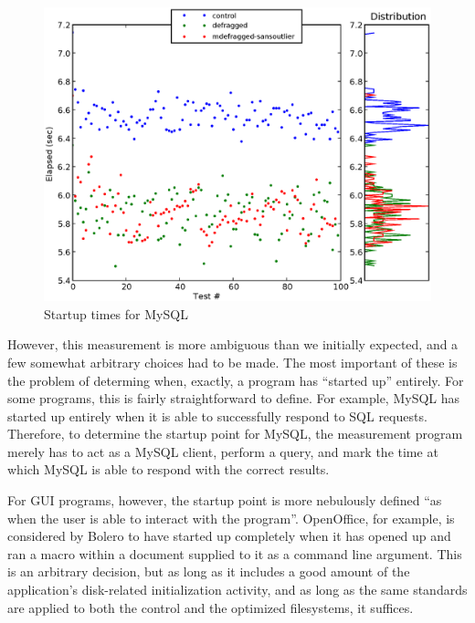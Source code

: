 \documentclass[10pt,twocolumn,letterpaper]{article}
\begin{document}
\begin{figure}[!htb]
\includegraphics[scale=0.75]{mysql-chart.eps}
\caption{Startup times for MySQL}
\label{mysqlchart}
\end{figure}

However, this measurement is more ambiguous than we initially expected, and a few
somewhat arbitrary choices had to be made. The most important of these is the problem of determing when, exactly,
a program has ``started up'' entirely. For some programs, this is fairly straightforward to define. For example,
MySQL has started up entirely when it is able to successfully respond to SQL requests. Therefore,
to determine the startup point for MySQL, the measurement program merely has to act
as a MySQL client, perform a query, and mark the time at which MySQL is able to
respond with the correct results.

For GUI programs, however, the startup point is more nebulously defined ``as when the user is
able to interact with the program''. OpenOffice, for example, is considered by Bolero to have started up completely when it has opened up and ran a macro within a document supplied to it as a command line argument. This is an arbitrary decision, but as long as it includes a good amount of the application's disk-related initialization activity, and as long as the same standards are applied to both the control and the optimized filesystems,
it suffices.
\end{document}
